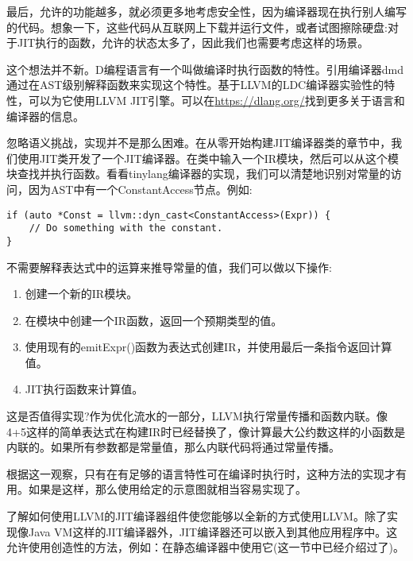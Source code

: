 最后，允许的功能越多，就必须更多地考虑安全性，因为编译器现在执行别人编写的代码。想象一下，这些代码从互联网上下载并运行文件，或者试图擦除硬盘:对于JIT执行的函数，允许的状态太多了，因此我们也需要考虑这样的场景。\par

这个想法并不新。D编程语言有一个叫做编译时执行函数的特性。引用编译器dmd通过在AST级别解释函数来实现这个特性。基于LLVM的LDC编译器实验性的特性，可以为它使用LLVM JIT引擎。可以在\url{https://dlang.org/}找到更多关于语言和编译器的信息。\par

忽略语义挑战，实现并不是那么困难。在从零开始构建JIT编译器类的章节中，我们使用JIT类开发了一个JIT编译器。在类中输入一个IR模块，然后可以从这个模块查找并执行函数。看看tinylang编译器的实现，我们可以清楚地识别对常量的访问，因为AST中有一个ConstantAccess节点。例如:\par

\begin{lstlisting}[caption={}]
if (auto *Const = llvm::dyn_cast<ConstantAccess>(Expr)) {
	// Do something with the constant.
}
\end{lstlisting}

不需要解释表达式中的运算来推导常量的值，我们可以做以下操作:\par

\begin{enumerate}
\item 创建一个新的IR模块。

\item 在模块中创建一个IR函数，返回一个预期类型的值。

\item 使用现有的emitExpr()函数为表达式创建IR，并使用最后一条指令返回计算值。

\item JIT执行函数来计算值。
\end{enumerate}

这是否值得实现?作为优化流水的一部分，LLVM执行常量传播和函数内联。像4+5这样的简单表达式在构建IR时已经替换了，像计算最大公约数这样的小函数是内联的。如果所有参数都是常量值，那么内联代码将通过常量传播。\par

根据这一观察，只有在有足够的语言特性可在编译时执行时，这种方法的实现才有用。如果是这样，那么使用给定的示意图就相当容易实现了。\par

了解如何使用LLVM的JIT编译器组件使您能够以全新的方式使用LLVM。除了实现像Java VM这样的JIT编译器外，JIT编译器还可以嵌入到其他应用程序中。这允许使用创造性的方法，例如：在静态编译器中使用它(这一节中已经介绍过了)。\par





















